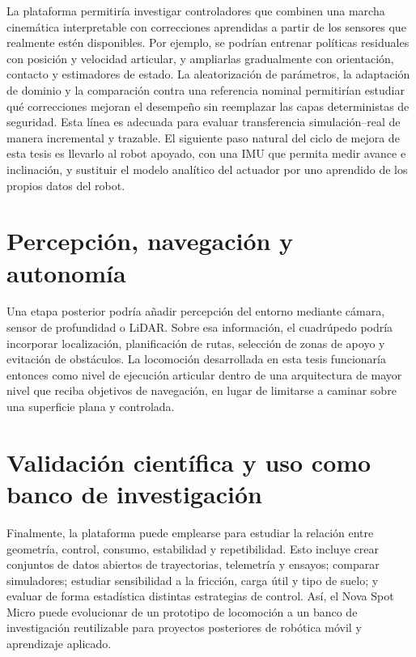 La plataforma permitiría investigar controladores que combinen una marcha
cinemática interpretable con correcciones aprendidas a partir de los sensores
que realmente estén disponibles. Por ejemplo, se podrían entrenar políticas
residuales con posición y velocidad articular, y ampliarlas gradualmente con
orientación, contacto y estimadores de estado. La aleatorización de parámetros,
la adaptación de dominio y la comparación contra una referencia nominal
permitirían estudiar qué correcciones mejoran el desempeño sin reemplazar las
capas deterministas de seguridad. Esta línea es adecuada para evaluar
transferencia simulación--real de manera incremental y trazable. El siguiente
paso natural del ciclo de mejora de esta tesis es llevarlo al robot apoyado,
con una IMU que permita medir avance e inclinación, y sustituir el modelo
analítico del actuador por uno aprendido de los propios datos del robot.

\section{Percepción, navegación y autonomía}

Una etapa posterior podría añadir percepción del entorno mediante cámara,
sensor de profundidad o LiDAR. Sobre esa información, el cuadrúpedo podría
incorporar localización, planificación de rutas, selección de zonas de apoyo y
evitación de obstáculos. La locomoción desarrollada en esta tesis funcionaría
entonces como nivel de ejecución articular dentro de una arquitectura de mayor
nivel que reciba objetivos de navegación, en lugar de limitarse a caminar sobre
una superficie plana y controlada.

\section{Validación científica y uso como banco de investigación}

Finalmente, la plataforma puede emplearse para estudiar la relación entre
geometría, control, consumo, estabilidad y repetibilidad. Esto incluye crear
conjuntos de datos abiertos de trayectorias, telemetría y ensayos; comparar
simuladores; estudiar sensibilidad a la fricción, carga útil y tipo de suelo;
y evaluar de forma estadística distintas estrategias de control. Así, el Nova
Spot Micro puede evolucionar de un prototipo de locomoción a un banco de
investigación reutilizable para proyectos posteriores de robótica móvil y
aprendizaje aplicado.
